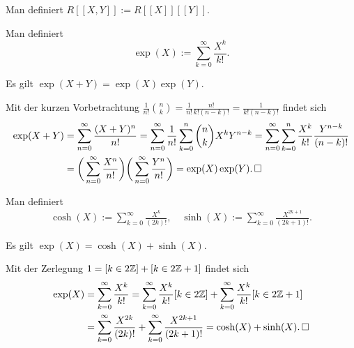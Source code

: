 \begin{Definition}\newlinefirst
Man definiert $R[[X,Y]]:=R[[X]][[Y]]$.
\end{Definition}

\begin{Definition}[Exponentialreihe] Man definiert
\[\exp(X) := \sum_{k=0}^\infty \frac{X^k}{k!}.\]
\end{Definition}

\begin{Korollar}
Es gilt $\exp(X+Y) = \exp(X)\exp(Y)$.
\end{Korollar}
\begin{Beweis}
Mit der kurzen Vorbetrachtung
$\frac{1}{n!}\binom{n}{k} = \frac{1}{n!}\frac{n!}{k!(n-k)!} = \frac{1}{k!(n-k)!}$
findet sich
\begin{align*}
\exp(X+Y) &= \sum_{n=0}^\infty\frac{(X+Y)^n}{n!}
= \sum_{n=0}^\infty\frac{1}{n!}\sum_{k=0}^n\binom{n}{k}X^k Y^{n-k}
= \sum_{n=0}^\infty\sum_{k=0}^n\frac{X^k}{k!}\frac{Y^{n-k}}{(n-k)!}\\
&= \bigg(\sum_{n=0}^\infty\frac{X^n}{n!}\bigg)
\bigg(\sum_{n=0}^\infty\frac{Y^n}{n!}\bigg)
= \exp(X)\exp(Y).\,\square
\end{align*}
\end{Beweis}

\begin{Definition} Man definiert
\begin{gather*}
\cosh(X) := \sum_{k=0}^\infty \frac{X^k}{(2k)!},\quad
\sinh(X) := \sum_{k=0}^\infty \frac{X^{2k+1}}{(2k+1)!}.
\end{gather*}
\end{Definition}

\begin{Korollar}%
\label{exp-parity}\newlinefirst
Es gilt $\exp(X)=\cosh(X)+\sinh(X)$.
\end{Korollar}
\begin{Beweis}
Mit der Zerlegung $1 = [k\in 2\mathbb Z] + [k\in 2\mathbb Z+1]$ findet sich
\begin{align*}
\exp(X) &= \sum_{k=0}^\infty\frac{X^k}{k!}
= \sum_{k=0}^\infty\frac{X^k}{k!}[k\in 2\mathbb Z] + \sum_{k=0}^\infty\frac{X^k}{k!}[k\in 2\mathbb Z+1]\\
&= \sum_{k=0}^\infty\frac{X^{2k}}{(2k)!}
+ \sum_{k=0}^\infty\frac{X^{2k+1}}{(2k+1)!}
= \cosh(X) + \sinh(X).\,\square
\end{align*}
\end{Beweis}

